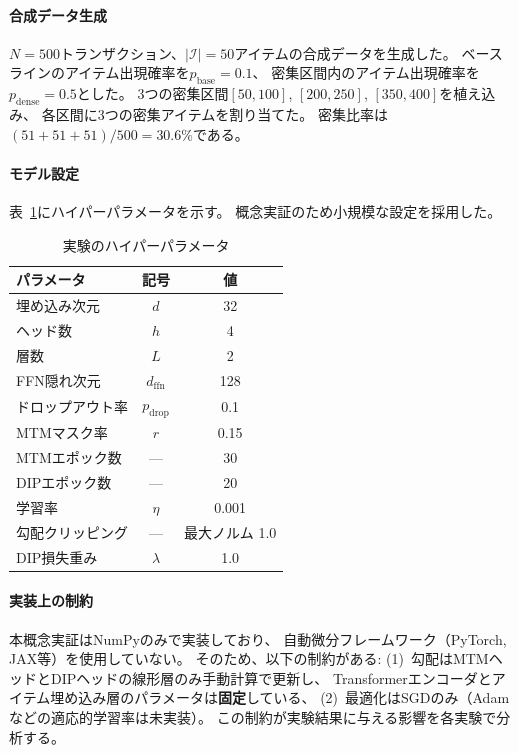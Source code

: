 \documentclass[sigconf,nonacm]{acmart}
\begin{document}
\paragraph{合成データ生成}
$N=500$トランザクション、$|\mathcal{I}|=50$アイテムの合成データを生成した。
ベースラインのアイテム出現確率を$p_{\text{base}}=0.1$、
密集区間内のアイテム出現確率を$p_{\text{dense}}=0.5$とした。
3つの密集区間$[50, 100]$, $[200, 250]$, $[350, 400]$を植え込み、
各区間に3つの密集アイテムを割り当てた。
密集比率は$(51+51+51)/500 = 30.6\%$である。

\paragraph{モデル設定}
表~\ref{tab:hyperparams}にハイパーパラメータを示す。
概念実証のため小規模な設定を採用した。

\begin{table}[t]
\centering
\caption{実験のハイパーパラメータ}
\label{tab:hyperparams}
\begin{tabular}{lcc}
\toprule
パラメータ & 記号 & 値 \\
\midrule
埋め込み次元 & $d$ & 32 \\
ヘッド数 & $h$ & 4 \\
層数 & $L$ & 2 \\
FFN隠れ次元 & $d_{\text{ffn}}$ & 128 \\
ドロップアウト率 & $p_{\text{drop}}$ & 0.1 \\
MTMマスク率 & $r$ & 0.15 \\
MTMエポック数 & --- & 30 \\
DIPエポック数 & --- & 20 \\
学習率 & $\eta$ & 0.001 \\
勾配クリッピング & --- & 最大ノルム 1.0 \\
DIP損失重み & $\lambda$ & 1.0 \\
\bottomrule
\end{tabular}
\end{table}

\paragraph{実装上の制約}
本概念実証はNumPyのみで実装しており、
自動微分フレームワーク（PyTorch, JAX等）を使用していない。
そのため、以下の制約がある:
(1)~勾配はMTMヘッドとDIPヘッドの線形層のみ手動計算で更新し、
Transformerエンコーダとアイテム埋め込み層のパラメータは\textbf{固定}している、
(2)~最適化はSGDのみ（Adamなどの適応的学習率は未実装）。
この制約が実験結果に与える影響を各実験で分析する。
\end{document}
